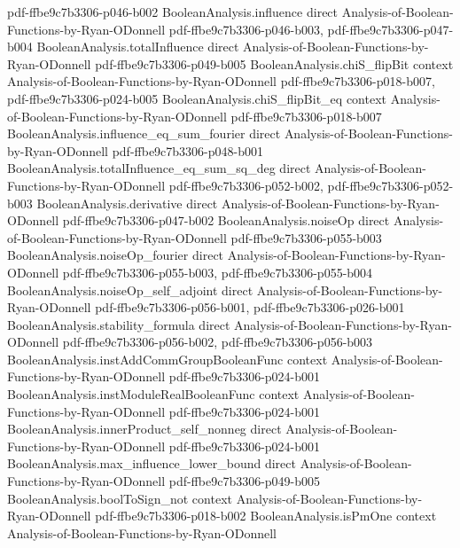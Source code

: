 \begin{lemma}
  {pdf-ffbe9c7b3306-p046-b002}
\proofstep
  {BooleanAnalysis.influence}
  {direct}
  {Analysis-of-Boolean-Functions-by-Ryan-ODonnell}
  {pdf-ffbe9c7b3306-p046-b003,
    pdf-ffbe9c7b3306-p047-b004}
\proofstep
  {BooleanAnalysis.totalInfluence}
  {direct}
  {Analysis-of-Boolean-Functions-by-Ryan-ODonnell}
  {pdf-ffbe9c7b3306-p049-b005}
\proofstep
  {BooleanAnalysis.chiS_flipBit}
  {context}
  {Analysis-of-Boolean-Functions-by-Ryan-ODonnell}
  {pdf-ffbe9c7b3306-p018-b007,
    pdf-ffbe9c7b3306-p024-b005}
\proofstep
  {BooleanAnalysis.chiS_flipBit_eq}
  {context}
  {Analysis-of-Boolean-Functions-by-Ryan-ODonnell}
  {pdf-ffbe9c7b3306-p018-b007}
\proofstep
  {BooleanAnalysis.influence_eq_sum_fourier}
  {direct}
  {Analysis-of-Boolean-Functions-by-Ryan-ODonnell}
  {pdf-ffbe9c7b3306-p048-b001}
\proofstep
  {BooleanAnalysis.totalInfluence_eq_sum_sq_deg}
  {direct}
  {Analysis-of-Boolean-Functions-by-Ryan-ODonnell}
  {pdf-ffbe9c7b3306-p052-b002,
    pdf-ffbe9c7b3306-p052-b003}
\proofstep
  {BooleanAnalysis.derivative}
  {direct}
  {Analysis-of-Boolean-Functions-by-Ryan-ODonnell}
  {pdf-ffbe9c7b3306-p047-b002}
\proofstep
  {BooleanAnalysis.noiseOp}
  {direct}
  {Analysis-of-Boolean-Functions-by-Ryan-ODonnell}
  {pdf-ffbe9c7b3306-p055-b003}
\proofstep
  {BooleanAnalysis.noiseOp_fourier}
  {direct}
  {Analysis-of-Boolean-Functions-by-Ryan-ODonnell}
  {pdf-ffbe9c7b3306-p055-b003,
    pdf-ffbe9c7b3306-p055-b004}
\proofstep
  {BooleanAnalysis.noiseOp_self_adjoint}
  {direct}
  {Analysis-of-Boolean-Functions-by-Ryan-ODonnell}
  {pdf-ffbe9c7b3306-p056-b001,
    pdf-ffbe9c7b3306-p026-b001}
\proofstep
  {BooleanAnalysis.stability_formula}
  {direct}
  {Analysis-of-Boolean-Functions-by-Ryan-ODonnell}
  {pdf-ffbe9c7b3306-p056-b002,
    pdf-ffbe9c7b3306-p056-b003}
\proofstep
  {BooleanAnalysis.instAddCommGroupBooleanFunc}
  {context}
  {Analysis-of-Boolean-Functions-by-Ryan-ODonnell}
  {pdf-ffbe9c7b3306-p024-b001}
\proofstep
  {BooleanAnalysis.instModuleRealBooleanFunc}
  {context}
  {Analysis-of-Boolean-Functions-by-Ryan-ODonnell}
  {pdf-ffbe9c7b3306-p024-b001}
\proofstep
  {BooleanAnalysis.innerProduct_self_nonneg}
  {direct}
  {Analysis-of-Boolean-Functions-by-Ryan-ODonnell}
  {pdf-ffbe9c7b3306-p024-b001}
\proofstep
  {BooleanAnalysis.max_influence_lower_bound}
  {direct}
  {Analysis-of-Boolean-Functions-by-Ryan-ODonnell}
  {pdf-ffbe9c7b3306-p049-b005}
\proofstep
  {BooleanAnalysis.boolToSign_not}
  {context}
  {Analysis-of-Boolean-Functions-by-Ryan-ODonnell}
  {pdf-ffbe9c7b3306-p018-b002}
\proofstep
  {BooleanAnalysis.isPmOne}
  {context}
  {Analysis-of-Boolean-Functions-by-Ryan-ODonnell}

\end{lemma}
